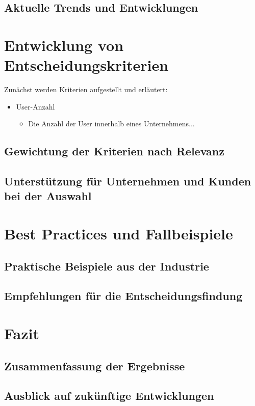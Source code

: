 \documentclass[12pt,bibtotoc]{article}
\begin{document}
			\subsection{Aktuelle Trends und Entwicklungen}

	\section{Entwicklung von Entscheidungskriterien}
	Zunächst werden Kriterien aufgestellt und erläutert:
	\begin{itemize}
		\item User-Anzahl
		\begin{itemize}
			\item Die Anzahl der User innerhalb eines Unternehmens...
		\end{itemize}
	\end{itemize}
		\subsection{Gewichtung der Kriterien nach Relevanz}
		\subsection{Unterstützung für Unternehmen und Kunden bei der Auswahl}

	\section{Best Practices und Fallbeispiele}
		\subsection{Praktische Beispiele aus der Industrie}
		\subsection{Empfehlungen für die Entscheidungsfindung}

	\section{Fazit}
		\subsection{Zusammenfassung der Ergebnisse}
		\subsection{Ausblick auf zukünftige Entwicklungen}
\end{document}
